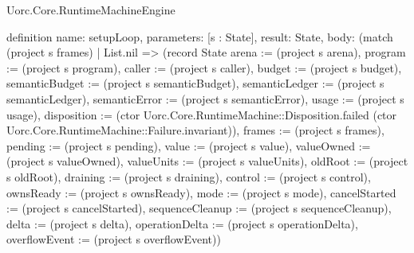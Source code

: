 \begin{lexlean}{Uorc.Core.RuntimeMachineEngine}
\begin{semanticmodule}
definition{
  name: setupLoop,
  parameters: [s : State],
  result: State,
  body: (match (project s frames)
    | List.nil => (record State {arena := (project s arena), program := (project s program), caller := (project s caller), budget := (project s budget), semanticBudget := (project s semanticBudget), semanticLedger := (project s semanticLedger), semanticError := (project s semanticError), usage := (project s usage), disposition := (ctor Uorc.Core.RuntimeMachine::Disposition.failed (ctor Uorc.Core.RuntimeMachine::Failure.invariant)), frames := (project s frames), pending := (project s pending), value := (project s value), valueOwned := (project s valueOwned), valueUnits := (project s valueUnits), oldRoot := (project s oldRoot), draining := (project s draining), control := (project s control), ownsReady := (project s ownsReady), mode := (project s mode), cancelStarted := (project s cancelStarted), sequenceCleanup := (project s sequenceCleanup), delta := (project s delta), operationDelta := (project s operationDelta), overflowEvent := (project s overflowEvent)})
}
\end{semanticmodule}
\end{lexlean}
